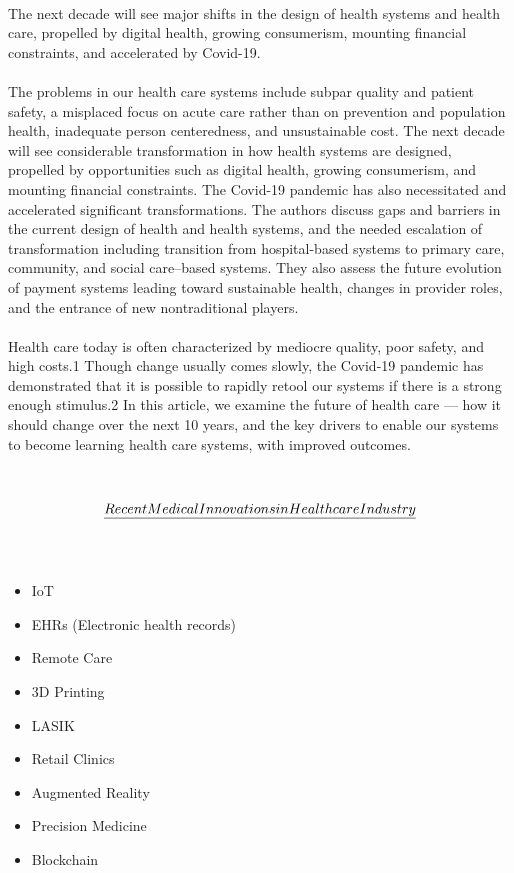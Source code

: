 \documentclass[12pt]{article}
\begin{document}
\\
The next decade will see major shifts in the design of health systems and health care, propelled by digital health, growing consumerism, mounting financial constraints, and accelerated by Covid-19.
\\
\\
The problems in our health care systems include subpar quality and patient safety, a misplaced focus on acute care rather than on prevention and population health, inadequate person centeredness, and unsustainable cost. The next decade will see considerable transformation in how health systems are designed, propelled by opportunities such as digital health, growing consumerism, and mounting financial constraints. The Covid-19 pandemic has also necessitated and accelerated significant transformations. The authors discuss gaps and barriers in the current design of health and health systems, and the needed escalation of transformation including transition from hospital-based systems to primary care, community, and social care–based systems. They also assess the future evolution of payment systems leading toward sustainable health, changes in provider roles, and the entrance of new nontraditional players.
\\
\\
Health care today is often characterized by mediocre quality, poor safety, and high costs.1 Though change usually comes slowly, the Covid-19 pandemic has demonstrated that it is possible to rapidly retool our systems if there is a strong enough stimulus.2 In this article, we examine the future of health care — how it should change over the next 10 years, and the key drivers to enable our systems to become learning health care systems, with improved outcomes.
\\
\\
\\
\begin{align}
 \LARGE{\underline{Recent Medical Innovations in Healthcare Industry}}
\end{align}
\\
\\
\begin{itemize}
    \item IoT
    \item EHRs (Electronic health records)
    \item Remote Care
    \item 3D Printing
    \item LASIK
    \item Retail Clinics
    \item Augmented Reality
    \item Precision Medicine
    \item Blockchain
\end{itemize}




\enddocument
\end{document}
